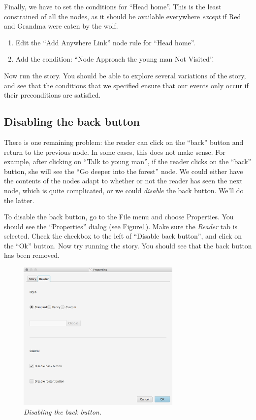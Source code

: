 \documentclass{article}
\begin{document}
Finally, we have to set the conditions for ``Head home''. This is the least constrained of all the nodes, as it should be available everywhere
\textit{except} if Red and Grandma were eaten by the wolf.

\begin{enumerate}
  \item Edit the ``Add Anywhere Link'' node rule for ``Head home''.
  \item Add the condition: ``Node Approach the young man Not Visited''.
\end{enumerate}

Now run the story. You should be able to explore several variations of the story, and see that the conditions that we specified ensure that our events only occur if their preconditions are satisfied.

\subsection{Disabling the back button}

There is one remaining problem: the reader can click on the ``back'' button and return to the previous node. In some cases, this does not make sense. For example, after clicking on ``Talk to young man'', if the reader clicks on the ``back'' button, she will see the ``Go deeper into the forest'' node. We could either have the contents of the nodes adapt to whether or not the reader has seen the next node, which is quite complicated, or we could \textit{disable} the back button. We'll do the latter.

To disable the back button, go to the File menu and choose Properties. You should see the ``Properties'' dialog (see Figure\ref{fig:tut3:preferences}). Make sure the \textit{Reader} tab is selected. Check the checkbox to the left of ``Disable back button'', and click on the ``Ok'' button. Now try running the story. You should see that the back button has been removed.

\begin{figure}[h]
  \centering
  \includegraphics[width=8cm]{images/hypedyn-tutorial-3-figure-8}
  \caption{\textit{Disabling the back button.}}
  \label{fig:tut3:preferences}
\end{figure} 
\end{document}

